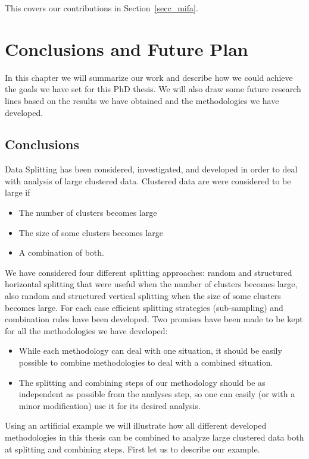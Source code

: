 \documentclass[11pt,a5paper,twoside]{book}
\begin{document}
This covers our contributions in Section~\ref{secc_mifa}.

\chapter{Conclusions and Future Plan}
\label{chap_conclusions}

In this chapter we will summarize our work and describe how we could achieve the goals we have set for this PhD thesis. We will also draw some future research lines based on the results we have obtained and the methodologies we have developed.

\section{Conclusions}
\label{sec_conc}
Data Splitting has been considered, investigated, and developed in order to deal with analysis of large clustered data. Clustered data are were considered to be large if

\begin{itemize}
\item The number of clusters becomes large
\item The size of some clusters becomes large
\item A combination of both.
\end{itemize}
We have considered four different splitting approaches: random and structured horizontal splitting that were useful when the number of clusters becomes large, also random and structured vertical splitting when the size of some clusters becomes large. For each case efficient splitting strategies (sub-sampling) and combination rules have been developed. Two promises have been made to be kept for all the methodologies we have developed:


\begin{itemize}
\item While each methodology can deal with one situation, it should be easily possible to combine methodologies to deal with a combined situation.

\item The splitting and combining steps of our methodology should be as independent as possible from the analyses step, so one can easily (or with a minor modification) use it for its desired analysis.
 
\end{itemize}

Using an artificial example we will illustrate how all different developed methodologies in this thesis can be combined to analyze large clustered data both at splitting and combining steps. First let us to describe our example.
\end{document}
